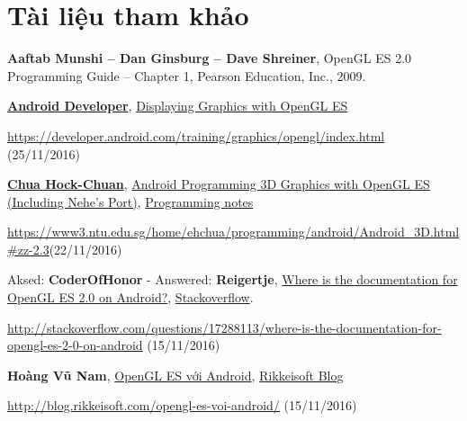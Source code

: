 \documentclass[13pt,a4paper]{extreport}
\begin{document}
\chapter*{Tài liệu tham khảo}
	\begin{enumerate}[{[1]}]
		\item \textbf{Aaftab Munshi -- Dan Ginsburg -- Dave Shreiner}, OpenGL ES 2.0 Programming Guide -- Chapter 1, Pearson Education, Inc., 2009.
		
		\item \href{https://developer.android.com/index.html}{\textbf{Android Developer}}, \href{https://developer.android.com/training/graphics/opengl/index.html}{Displaying Graphics with OpenGL ES}
		
		\href{https://developer.android.com/training/graphics/opengl/index.html}{https://developer.android.com/training/graphics/opengl/index.html} (25/11/2016)
		
		\item \href{ehchua@ntu.edu.sg}{\textbf{Chua Hock-Chuan}}, \href{https://www3.ntu.edu.sg/home/ehchua/programming/android/Android_3D.html#zz-2.3}{Android Programming 3D Graphics with OpenGL ES (Including Nehe's Port)}, \href{https://www3.ntu.edu.sg/home/ehchua/programming/index.html}{Programming notes}
			
			\href{https://www3.ntu.edu.sg/home/ehchua/programming/android/Android_3D.html#zz-2.3}{https://www3.ntu.edu.sg/home/ehchua/programming/android/Android\_3D.html\#zz-2.3}(22/11/2016)		
			
		\item Aksed: \textbf{CoderOfHonor} - Answered: \textbf{Reigertje}, \href{http://stackoverflow.com/questions/17288113/where-is-the-documentation-for-opengl-es-2-0-on-android}{Where is the documentation for OpenGL ES 2.0 on Android?}, \href{http://stackoverflow.com/}{Stackoverflow}.
		
		\href{http://stackoverflow.com/questions/17288113/where-is-the-documentation-for-opengl-es-2-0-on-android}{http://stackoverflow.com/questions/17288113/where-is-the-documentation-for-opengl-es-2-0-on-android} (15/11/2016)
		
		\item \textbf{Hoàng Vũ Nam}, \href{http://blog.rikkeisoft.com/opengl-es-voi-android/}{OpenGL ES với Android}, \href{http://blog.rikkeisoft.com/}{Rikkeisoft Blog}
		
		\href{http://blog.rikkeisoft.com/opengl-es-voi-android/}{http://blog.rikkeisoft.com/opengl-es-voi-android/} (15/11/2016)
		

\end{enumerate}
\end{document}
